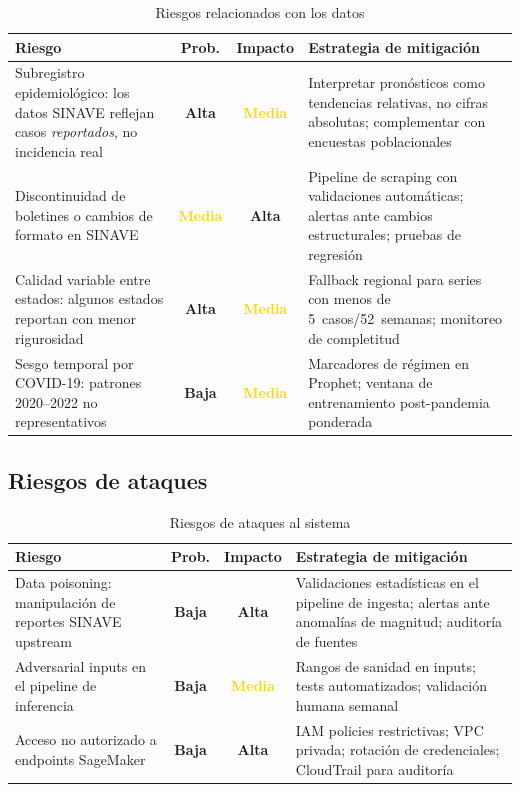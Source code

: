 \documentclass[12pt, letterpaper]{article}
\newcommand{\riskHigh}{\cellcolor{lightred}\textbf{\textcolor{burgundy}{Alta}}}
\newcommand{\riskMed}{\cellcolor{lightyellow}\textbf{\textcolor{gold}{Media}}}
\newcommand{\riskLow}{\cellcolor{lightgreen}\textbf{\textcolor{darkteal}{Baja}}}
\begin{document}
\begin{table}[H]
\centering
\caption{Riesgos relacionados con los datos}
\label{tab:riesgos_datos}
\scriptsize
\setlength{\tabcolsep}{3pt}
\begin{tabularx}{\textwidth}{>{\raggedright\arraybackslash}X c c >{\raggedright\arraybackslash}X}
\toprule
\textbf{Riesgo} & \textbf{Prob.} & \textbf{Impacto} & \textbf{Estrategia de mitigación} \\
\midrule
Subregistro epidemiológico: los datos SINAVE reflejan casos \emph{reportados}, no incidencia real & \riskHigh & \riskMed & Interpretar pronósticos como tendencias relativas, no cifras absolutas; complementar con encuestas poblacionales \\
\addlinespace
Discontinuidad de boletines o cambios de formato en SINAVE & \riskMed & \riskHigh & Pipeline de scraping con validaciones automáticas; alertas ante cambios estructurales; pruebas de regresión \\
\addlinespace
Calidad variable entre estados: algunos estados reportan con menor rigurosidad & \riskHigh & \riskMed & Fallback regional para series con menos de 5~casos/52~semanas; monitoreo de completitud \\
\addlinespace
Sesgo temporal por COVID-19: patrones 2020--2022 no representativos & \riskLow & \riskMed & Marcadores de régimen en Prophet; ventana de entrenamiento post-pandemia ponderada \\
\bottomrule
\end{tabularx}
\end{table}

\subsection{Riesgos de ataques}

\begin{table}[H]
\centering
\caption{Riesgos de ataques al sistema}
\label{tab:riesgos_ataques}
\scriptsize
\setlength{\tabcolsep}{3pt}
\begin{tabularx}{\textwidth}{>{\raggedright\arraybackslash}X c c >{\raggedright\arraybackslash}X}
\toprule
\textbf{Riesgo} & \textbf{Prob.} & \textbf{Impacto} & \textbf{Estrategia de mitigación} \\
\midrule
Data poisoning: manipulación de reportes SINAVE upstream & \riskLow & \riskHigh & Validaciones estadísticas en el pipeline de ingesta; alertas ante anomalías de magnitud; auditoría de fuentes \\
\addlinespace
Adversarial inputs en el pipeline de inferencia & \riskLow & \riskMed & Rangos de sanidad en inputs; tests automatizados; validación humana semanal \\
\addlinespace
Acceso no autorizado a endpoints SageMaker & \riskLow & \riskHigh & IAM policies restrictivas; VPC privada; rotación de credenciales; CloudTrail para auditoría \\
\bottomrule
\end{tabularx}
\end{table}
\end{document}
